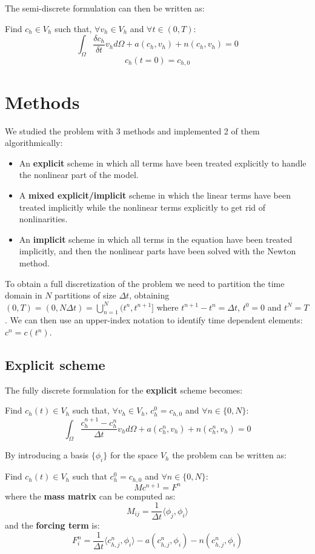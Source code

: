 \documentclass[12pt, letterpaper]{article}
\begin{document}
\noindent The semi-discrete formulation can then be written as:

\vspace{1em}
\noindent
Find $c_h\in V_h$ such that, $\forall v_h\in V_h$ and $\forall t\in(0,T)$:
$$\int_\Omega\frac{\delta c_h}{\delta t}v_hd\Omega+a(c_h,v_h)+n(c_h,v_h)=0$$
$$c_h(t=0)=c_{h,0}$$

\section{Methods}

We studied the problem with 3 methods and implemented 2 of them algorithmically:
\begin{itemize}
    \item An \textbf{explicit} scheme in which all terms have been treated explicitly to handle the nonlinear part of the model.
    \item A \textbf{mixed explicit/implicit} scheme in which the linear terms have been treated implicitly while the nonlinear terms explicitly to get rid of nonlinarities.
    \item An \textbf{implicit} scheme in which all terms in the equation have been treated implicitly, and then the nonlinear parts have been solved with the Newton method.
\end{itemize}

\noindent To obtain a full discretization of the problem we need to partition the time domain in $N$ partitions of size $\Delta t$, obtaining $(0, T)=(0,N\Delta t)=\bigcup_{n=1}^N(t^n, t^{n+1}]$ where $t^{n+1}-t^n=\Delta t$, $t^0=0$ and $t^N=T$. We can then use an upper-index notation to identify time dependent elements: $c^n = c(t^n)$.

\subsection{Explicit scheme}

The fully discrete formulation for the \textbf{explicit} scheme becomes:

\vspace{1em}
\noindent
Find $c_h(t)\in V_h$ such that, $\forall v_h\in V_h$, $c_h^0=c_{h,0}$ and $\forall n\in\{0, N\}$:
$$\int_\Omega\frac{c_h^{n+1}-c_h^n}{\Delta t}v_hd\Omega+a(c_h^n,v_h)+n(c_h^n,v_h)=0$$

\noindent By introducing a basis $\{\phi_i\}$ for the space $V_h$ the problem can be written as:

\vspace{1em}
\noindent
Find $c_h(t)\in V_h$ such that $c_h^0=c_{h,0}$ and $\forall n\in\{0, N\}$:
$$Mc^{n+1}=F^n$$
where the \textbf{mass matrix} can be computed as:
$$M_{ij}=\frac1{\Delta t}\langle\phi_j,\phi_i\rangle$$
and the \textbf{forcing term} is:
$$F_i^n=\frac1{\Delta t}\langle c_{h,j}^n,\phi_i\rangle-a(c_{h,j}^n,\phi_i)-n(c_{h,j}^n,\phi_i)$$
\end{document}
